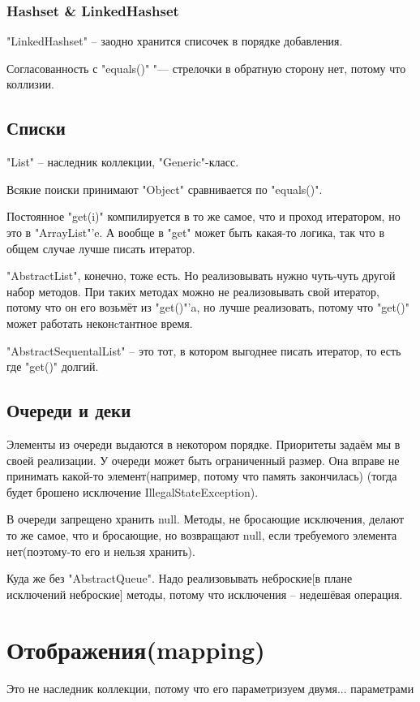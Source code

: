 \subsubsection{Hashset \& LinkedHashset}
\java"LinkedHashset" -- заодно хранится списочек в порядке добавления.


Согласованность с \java"equals()" "--- стрелочки в обратную сторону нет, потому что коллизии.

\subsection{Списки}
\java"List" -- наследник коллекции, \java"Generic"-класс.

Всякие поиски принимают \java"Object" \rightarrow сравнивается по \java"equals()".

Постоянное \java"get(i)" компилируется в то же самое, что и проход итератором, но это в \java"ArrayList"'e.
А вообще в \java"get" может быть какая-то логика, так что в общем случае лучше писать итератор.

\java"AbstractList", конечно, тоже есть. 
Но реализовывать нужно чуть-чуть другой набор методов. При таких методах можно не реализовывать свой итератор,
потому что он его возьмёт из \java"get()"'a, но лучше реализовать, потому что \java"get()" может работать неконcтантное время.

\java"AbstractSequentalList" -- это тот, в котором выгоднее писать итератор, то есть где \java"get()" долгий.


\subsection{Очереди и деки}
Элементы из очереди выдаются в некотором порядке. Приоритеты задаём мы в своей реализации. У очереди может быть ограниченный размер.
Она вправе не принимать какой-то элемент(например, потому что память закончилась) (тогда будет брошено исключение IllegalStateException).

В очереди запрещено хранить null.
Методы, не бросающие исключения, делают то же самое, что и бросающие, но возвращают null, 
если требуемого элемента нет(поэтому-то его и нельзя хранить).

Куда же без \java"AbstractQueue". Надо реализовывать неброские[в плане исключений неброские] методы, 
потому что исключения -- недешёвая операция.


\section{Отображения(mapping)}
Это не наследник коллекции, потому что его параметризуем двумя... параметрами

